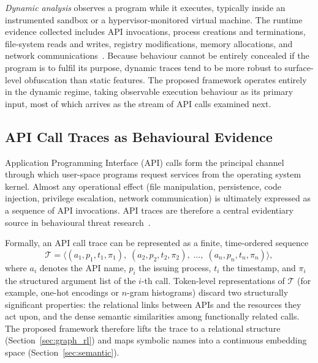 \documentclass[%
    BCOR=10mm,
    DIV=13,
    toc=bibliography,
    toc=listof,
    oneside,
    12pt,
]{scrbook}
\begin{document}
\textit{Dynamic analysis} observes a program while it executes, typically
inside an instrumented sandbox or a hypervisor-monitored virtual machine. The
runtime evidence collected includes API invocations, process creations and
terminations, file-system reads and writes, registry modifications, memory
allocations, and network communications~\cite{mimura2022nlp}. Because behaviour
cannot be entirely concealed if the program is to fulfil its purpose, dynamic
traces tend to be more robust to surface-level obfuscation than static
features. The proposed framework operates entirely in the dynamic regime,
taking observable execution behaviour as its primary input, most of which arrives
as the stream of API calls examined next.

\subsection{API Call Traces as Behavioural Evidence}
\label{subsec:api_traces}

Application Programming Interface (API) calls form the principal channel
through which user-space programs request services from the operating system
kernel. Almost any operational effect (file manipulation, persistence, code
injection, privilege escalation, network communication) is ultimately
expressed as a sequence of API invocations. API traces are therefore a central
evidentiary source in behavioural threat research~\cite{ucci2019survey,
mimura2022nlp, nguyen2023}.

Formally, an API call trace can be represented as a finite, time-ordered
sequence
\begin{equation}
  \mathcal{T} = \bigl\langle (a_1, p_1, t_1, \pi_1),\;
                              (a_2, p_2, t_2, \pi_2),\;
                              \ldots,\;
                              (a_n, p_n, t_n, \pi_n) \bigr\rangle,
  \label{eq:api_trace}
\end{equation}
where $a_i$ denotes the API name, $p_i$ the issuing process, $t_i$ the
timestamp, and $\pi_i$ the structured argument list of the $i$-th call.
Token-level representations of $\mathcal{T}$ (for example, one-hot encodings
or $n$-gram histograms) discard two structurally significant properties: the
relational links between APIs and the resources they act upon, and the dense
semantic similarities among functionally related calls. The proposed
framework therefore lifts the trace to a relational structure
(Section~\ref{sec:graph_rl}) and maps symbolic names into a continuous
embedding space (Section~\ref{sec:semantic}).
\end{document}
